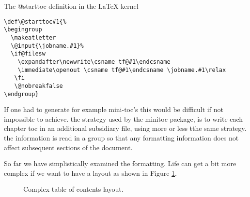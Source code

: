 \begin{tcolorbox}{The @starttoc definition in the LaTeX kernel}
\begin{lstlisting}
\def\@starttoc#1{%
\begingroup
  \makeatletter
  \@input{\jobname.#1}%
  \if@filesw
    \expandafter\newwrite\csname tf@#1\endcsname
    \immediate\openout \csname tf@#1\endcsname \jobname.#1\relax
   \fi
   \@nobreakfalse
\endgroup}
\end{lstlisting}
\end{tcolorbox}

If one had to generate for example mini-toc's this would be difficult if not impossible to achieve. the strategy used by the minitoc package, is to write each chapter toc in an additional subsidiary file, using more or less tthe same strategy. the information is read in a group so that any formatting information does not affect subsequent sections of the document.



So far we have simplistically examined the formatting. Life can get a bit more complex if we want to have a layout as shown in Figure \ref{fig:toc}.

\begin{figure}[tp]
\caption{Complex table of contents layout.}
\label{fig:toc}
\end{figure}


